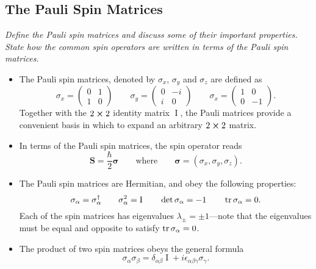 \documentclass[11pt, a4paper]{article}
\newcommand{\eqtext}[1]{\qquad \text{#1} \qquad}
\renewcommand{\vec}[1]{\bm{#1}}  %
\renewcommand{\S}{\vec{S}}  %
\newcommand{\II}{\operatorname{I}}  %
\begin{document}
\subsection{The Pauli Spin Matrices}
\textit{Define the Pauli spin matrices and discuss some of their important properties. State how the common spin operators are written in terms of the Pauli spin matrices.}
\begin{itemize}
	\item The Pauli spin matrices, denoted by $ \sigma_{x} $, $ \sigma_{y} $ and $ \sigma_{z} $ are defined as
	\begin{equation*}
		\sigma_{x} = 
		\begin{pmatrix}
			0 & 1\\
			1 & 0
		\end{pmatrix} \qquad 
		\sigma_{y} = 
		\begin{pmatrix}
			0 & -i\\
			i & 0
		\end{pmatrix} \qquad 
		\sigma_{x} = 
		\begin{pmatrix}
			1 & 0\\
			0 & -1
		\end{pmatrix}.
	\end{equation*}
	Together with the $ 2 \cross 2 $ identity matrix $ \II $, the Pauli matrices provide a convenient basis in which to expand an arbitrary $ 2 \cross 2 $ matrix. 
	
	\item In terms of the Pauli spin matrices, the spin operator reads
	\begin{equation*}
		\S = \frac{\hbar}{2}\vec{\sigma} \eqtext{where} \vec{\sigma} = (\sigma_{x}, \sigma_{y}, \sigma_{z}).
	\end{equation*}

	\item The Pauli spin matrices are Hermitian, and obey the following properties:
	\begin{equation*}
		\sigma_{\alpha} = \sigma_{\alpha}^{\dagger} \qquad \sigma_{\alpha}^{2} = \II \qquad \det \sigma_{\alpha} = -1 \qquad \tr \sigma_{\alpha} = 0.
	\end{equation*}
	Each of the spin matrices has eigenvalues $ \lambda_{\pm} = \pm 1 $---note that the eigenvalues must be equal and opposite to satisfy $ \tr \sigma_{\alpha} = 0 $.
	
	\item The product of two spin matrices obeys the general formula
	\begin{equation*}
		\sigma_{\alpha}\sigma_{\beta} = \delta_{\alpha \beta} \II + i \epsilon_{\alpha \beta \gamma}\sigma_{\gamma}.
	\end{equation*}
	

\end{itemize}
\end{document}
